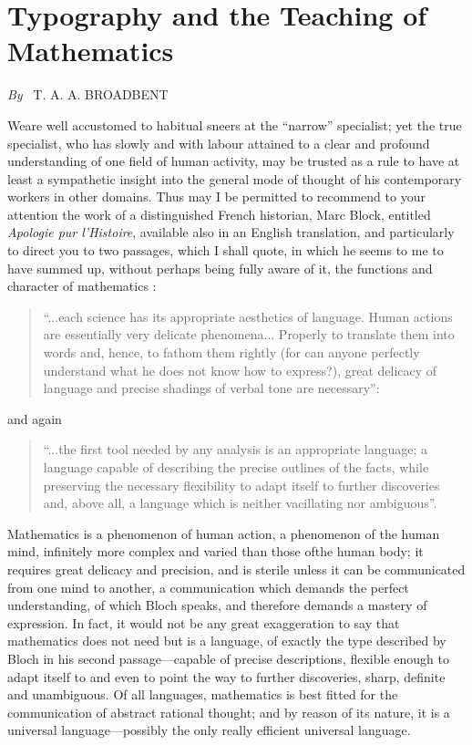 \chapter{Typography and the Teaching of Mathematics}

\begin{center}
{\em By}~ T. A. A. BROADBENT
\end{center}

\setcounter{pageoriginal}{146}
We\pageoriginale are well accustomed to habitual sneers at the ``narrow'' specialist; yet the true specialist, who has slowly and with labour attained to a clear and profound understanding of one field of human activity, may be trusted as a rule to have at least a sympathetic insight into the general mode of thought of his contemporary workers in other domains. Thus may I be permitted to recommend to your attention the work of a distinguished French historian, Marc Block, entitled {\em Apologie pur l'Histoire}, available also in an English translation, and particularly to direct you to two passages, which I shall quote, in which he seems to me to have summed up, without perhaps being fully aware of it, the functions and character of mathematics : 
\begin{quote}
``...each science has its appropriate aesthetics of language. Human actions are essentially very delicate phenomena... Properly to translate them into words and, hence, to fathom them rightly (for can anyone perfectly understand what he does not know how to express?), great delicacy of language and precise shadings of verbal tone are necessary'':
\end{quote}
and again
\begin{quote}
``...the first tool needed by any analysis is an appropriate language; a language capable of describing the precise outlines of the facts, while preserving the necessary flexibility to adapt itself to further discoveries and, above all, a language which is neither vacillating nor ambiguous''.
\end{quote}

Mathematics is a phenomenon of human action, a phenomenon of the human mind, infinitely more complex and varied than those of\pageoriginale the human body; it requires great delicacy and precision, and is sterile unless it can be communicated from one mind to another, a communication which demands the perfect understanding, of which Bloch speaks, and therefore demands a mastery of expression. In fact, it would not be any great exaggeration to say that mathematics does not need but is a language, of exactly the type described by Bloch in his second passage---capable of precise descriptions, flexible enough to adapt itself to and even to point the way to further discoveries, sharp, definite and unambiguous. Of all languages, mathematics is best fitted for the communication of abstract rational thought; and by reason of its nature, it is a universal language---possibly the only really efficient universal language.

